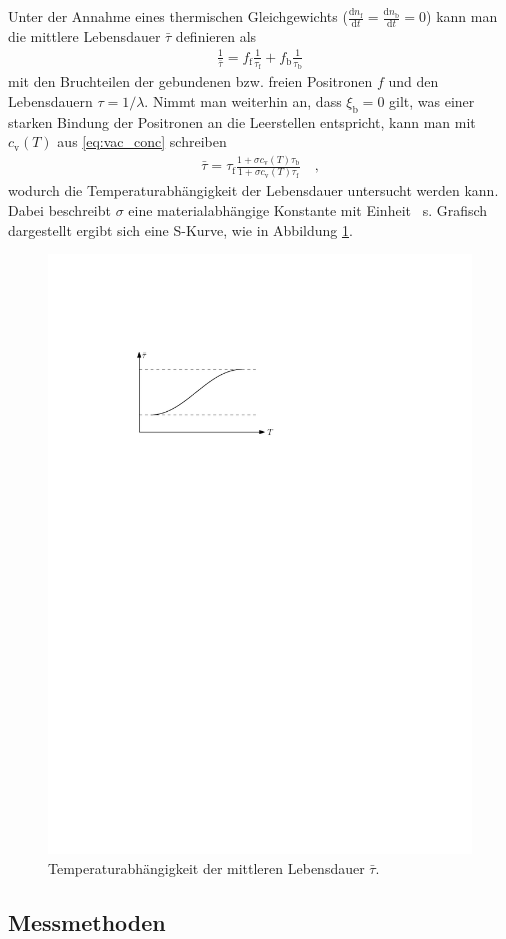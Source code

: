 \documentclass[11pt, a4paper]{article}
\numberwithin{equation}{section}
\begin{document}
Unter der Annahme eines thermischen Gleichgewichts ($\frac{\mathrm{d}n_\mathrm{f}}{\mathrm{d}t} = \frac{\mathrm{d}n_\mathrm{b}}{\mathrm{d}t} = 0$) kann man die mittlere Lebensdauer $\bar\tau$ definieren als
\begin{align}
	\frac{1}{\bar\tau}=f_\mathrm{f}\frac{1}{\tau_\mathrm{f}} + f_\mathrm{b}\frac{1}{\tau_\mathrm{b}}
\end{align}
mit den Bruchteilen der gebundenen bzw. freien Positronen $f$ und den Lebensdauern $\tau = 1/\lambda$.
Nimmt man weiterhin an, dass $\xi_\mathrm{b}=0$ gilt, was einer starken Bindung der Positronen an die Leerstellen entspricht, kann man mit $c_\mathrm{v}(T)$ aus \eqref{eq:vac_conc} schreiben
\begin{align}
	\bar\tau=\tau_\mathrm{f}\frac{1+\sigma c_\mathrm{v}(T)\tau_\mathrm{b}}{1+\sigma c_\mathrm{v}(T)\tau_\mathrm{f}}\quad\text{,}
	\label{eq:mean_lifetime}
\end{align}
wodurch die Temperaturabhängigkeit der Lebensdauer untersucht werden kann.
Dabei beschreibt $\sigma$ eine materialabhängige Konstante mit Einheit \si{\per\second}.
Grafisch dargestellt ergibt sich eine S-Kurve, wie in Abbildung \ref{fig:s_curve_schematic}.
\begin{figure}[htbp]
	\centering
	\includegraphics[width=.6\textwidth]{./figures/s_curve_schematic}
	\caption{Temperaturabhängigkeit der mittleren Lebensdauer $\bar\tau$.}
	\label{fig:s_curve_schematic}
\end{figure}
\subsection{Messmethoden}
\end{document}
